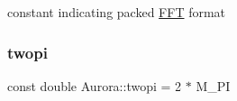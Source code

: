 constant indicating packed \hyperlink{class_aurora_1_1_f_f_t}{F\+FT} format \mbox{\label{namespace_aurora_a4c08f8416c2b35d5001062f121459b5a}} 
\subsubsection{\texorpdfstring{twopi}{twopi}}
{\footnotesize\ttfamily const double Aurora\+::twopi = 2 $\ast$ M\+\_\+\+PI}

